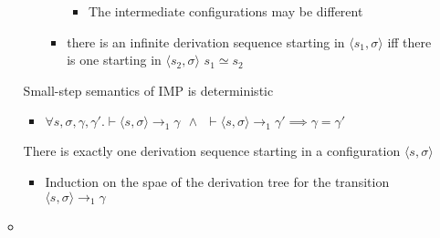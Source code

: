 \begin{itemize}
\begin{itemize}
\begin{itemize}
\begin{itemize}
\begin{itemize}
                                    \item The intermediate configurations may be different
                                \end{itemize}
                            \item there is an infinite derivation sequence starting in $\langle s_1, \sigma \rangle$ iff there is one starting in $\langle s_2, \sigma \rangle$
                             $s_1 \simeq s_2$
                        \end{itemize}
                \end{itemize}
                \begin{itemize}
                     Small-step semantics of IMP is deterministic
                        \begin{itemize}
                            \item $\forall s, \sigma, \gamma, \gamma'. \vdash \langle s, \sigma \rangle \to_1 \gamma \ \ \wedge \ \ \vdash \langle s, \sigma \rangle \to_1 \gamma' \implies \gamma = \gamma'$
                        \end{itemize}
                     There is exactly one derivation sequence starting in a configuration $\langle s, \sigma \rangle$
                        \begin{itemize}
                            \item Induction on the spae of the derivation tree for the transition $\langle s, \sigma \rangle \to_1 \gamma$
                        \end{itemize}
                \end{itemize}
        \end{itemize}
     
        \begin{itemize}
            \item
        \end{itemize}
\end{itemize}

